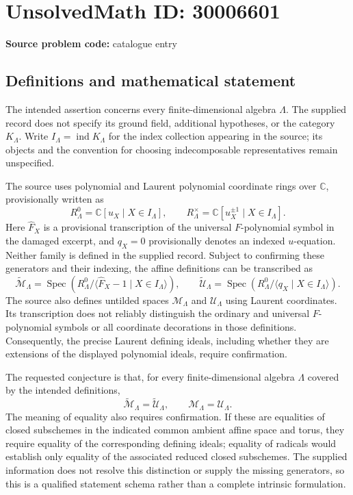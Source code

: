 \documentclass[11pt]{article}
\newcommand{\C}{\mathbb{C}}
\begin{document}
\section*{UnsolvedMath ID: 30006601}
\textbf{Source problem code:} catalogue entry
\subsection{Definitions and mathematical statement}
The intended assertion concerns every finite-dimensional algebra \(\Lambda\). The supplied record does not specify its ground field, additional hypotheses, or the category \(K_\Lambda\). Write \(I_\Lambda=\operatorname{ind}K_\Lambda\) for the index collection appearing in the source; its objects and the convention for choosing indecomposable representatives remain unspecified.

The source uses polynomial and Laurent polynomial coordinate rings over \(\C\), provisionally written as
\[
R_\Lambda^0=\C[u_X\mid X\in I_\Lambda],\qquad
R_\Lambda^\times=\C[u_X^{\pm1}\mid X\in I_\Lambda].
\]
Here \(\widehat F_X\) is a provisional transcription of the universal \(F\)-polynomial symbol in the damaged excerpt, and \(q_X=0\) provisionally denotes an indexed \(u\)-equation. Neither family is defined in the supplied record. Subject to confirming these generators and their indexing, the affine definitions can be transcribed as
\[
\widetilde{\mathcal M}_\Lambda
=\operatorname{Spec}\left(R_\Lambda^0/
\langle\widehat F_X-1\mid X\in I_\Lambda\rangle\right),
\qquad
\widetilde{\mathcal U}_\Lambda
=\operatorname{Spec}\left(R_\Lambda^0/
\langle q_X\mid X\in I_\Lambda\rangle\right).
\]
The source also defines untilded spaces \(\mathcal M_\Lambda\) and \(\mathcal U_\Lambda\) using Laurent coordinates. Its transcription does not reliably distinguish the ordinary and universal \(F\)-polynomial symbols or all coordinate decorations in those definitions. Consequently, the precise Laurent defining ideals, including whether they are extensions of the displayed polynomial ideals, require confirmation.

The requested conjecture is that, for every finite-dimensional algebra \(\Lambda\) covered by the intended definitions,
\[
\widetilde{\mathcal M}_\Lambda=\widetilde{\mathcal U}_\Lambda,
\qquad
\mathcal M_\Lambda=\mathcal U_\Lambda.
\]
The meaning of equality also requires confirmation. If these are equalities of closed subschemes in the indicated common ambient affine space and torus, they require equality of the corresponding defining ideals; equality of radicals would establish only equality of the associated reduced closed subschemes. The supplied information does not resolve this distinction or supply the missing generators, so this is a qualified statement schema rather than a complete intrinsic formulation.
\end{document}
